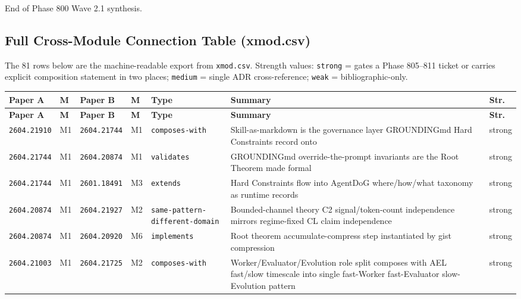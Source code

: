 \documentclass[11pt,letterpaper]{article}
\newcommand{\arxivid}[1]{\texttt{\textcolor{accent}{#1}}}
\begin{document}
End of Phase 800 Wave 2.1 synthesis.


\subsection{Full Cross-Module Connection Table (xmod.csv)}

The 81 rows below are the machine-readable export from \texttt{xmod.csv}. Strength values: \texttt{strong} = gates a Phase 805--811 ticket or carries explicit composition statement in two places; \texttt{medium} = single ADR cross-reference; \texttt{weak} = bibliographic-only.

\begin{footnotesize}
\renewcommand{\arraystretch}{1.10}
\begin{longtable}{@{}L{0.09\textwidth} L{0.03\textwidth} L{0.09\textwidth} L{0.03\textwidth} L{0.13\textwidth} L{0.40\textwidth} L{0.06\textwidth}@{}}
\toprule
\textbf{\sffamily Paper A} & \textbf{\sffamily M} & \textbf{\sffamily Paper B} & \textbf{\sffamily M} & \textbf{\sffamily Type} & \textbf{\sffamily Summary} & \textbf{\sffamily Str.} \\
\midrule
\endfirsthead
\toprule
\textbf{\sffamily Paper A} & \textbf{\sffamily M} & \textbf{\sffamily Paper B} & \textbf{\sffamily M} & \textbf{\sffamily Type} & \textbf{\sffamily Summary} & \textbf{\sffamily Str.} \\
\midrule
\endhead
\bottomrule
\endfoot
\arxivid{2604.21910} & M1 & \arxivid{2604.21744} & M1 & \texttt{\small composes-with} & Skill-as-markdown is the governance layer GROUNDINGmd Hard Constraints record onto & strong \\
\arxivid{2604.21744} & M1 & \arxivid{2604.20874} & M1 & \texttt{\small validates} & GROUNDINGmd override-the-prompt invariants are the Root Theorem made formal & strong \\
\arxivid{2604.21744} & M1 & \arxivid{2601.18491} & M3 & \texttt{\small extends} & Hard Constraints flow into AgentDoG where/how/what taxonomy as runtime records & strong \\
\arxivid{2604.20874} & M1 & \arxivid{2604.21927} & M2 & \texttt{\small same-pattern-different-domain} & Bounded-channel theory C2 signal/token-count independence mirrors regime-fixed CL claim independence & strong \\
\arxivid{2604.20874} & M1 & \arxivid{2604.20920} & M6 & \texttt{\small implements} & Root theorem accumulate-compress step instantiated by gist compression & strong \\
\arxivid{2604.21003} & M1 & \arxivid{2604.21725} & M2 & \texttt{\small composes-with} & Worker/Evaluator/Evolution role split composes with AEL fast/slow timescale into single fast-Worker fast-Evaluator slow-Evolution pattern & strong \\

\end{longtable}
\end{footnotesize}
\end{document}

